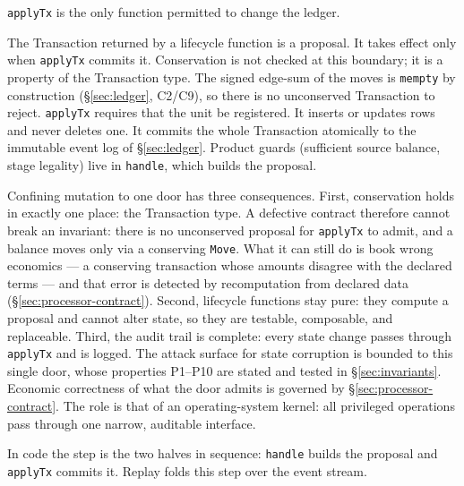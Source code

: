 \begin{principle}
\label{prin:executor}
\texttt{applyTx} is the only function permitted to change the ledger.
\end{principle}

The Transaction returned by a lifecycle function is a proposal. It takes effect only when \texttt{applyTx} commits it. Conservation is not checked at this boundary; it is a property of the Transaction type. The signed edge-sum of the moves is \texttt{mempty} by construction (\S\ref{sec:ledger}, C2/C9), so there is no unconserved Transaction to reject. \texttt{applyTx} requires that the unit be registered. It inserts or updates rows and never deletes one. It commits the whole Transaction atomically to the immutable event log of \S\ref{sec:ledger}. Product guards (sufficient source balance, stage legality) live in \texttt{handle}, which builds the proposal.

Confining mutation to one door has three consequences. First, conservation holds in exactly one place: the Transaction type. A defective contract therefore cannot break an invariant: there is no unconserved proposal for \texttt{applyTx} to admit, and a balance moves only via a conserving \texttt{Move}. What it can still do is book wrong economics --- a conserving transaction whose amounts disagree with the declared terms --- and that error is detected by recomputation from declared data (\S\ref{sec:processor-contract}). Second, lifecycle functions stay pure: they compute a proposal and cannot alter state, so they are testable, composable, and replaceable. Third, the audit trail is complete: every state change passes through \texttt{applyTx} and is logged. The attack surface for state corruption is bounded to this single door, whose properties P1--P10 are stated and tested in \S\ref{sec:invariants}. Economic correctness of what the door admits is governed by \S\ref{sec:processor-contract}. The role is that of an operating-system kernel: all privileged operations pass through one narrow, auditable interface.

\noindent In code the step is the two halves in sequence: \texttt{handle} builds the proposal and \texttt{applyTx} commits it. Replay folds this step over the event stream.

